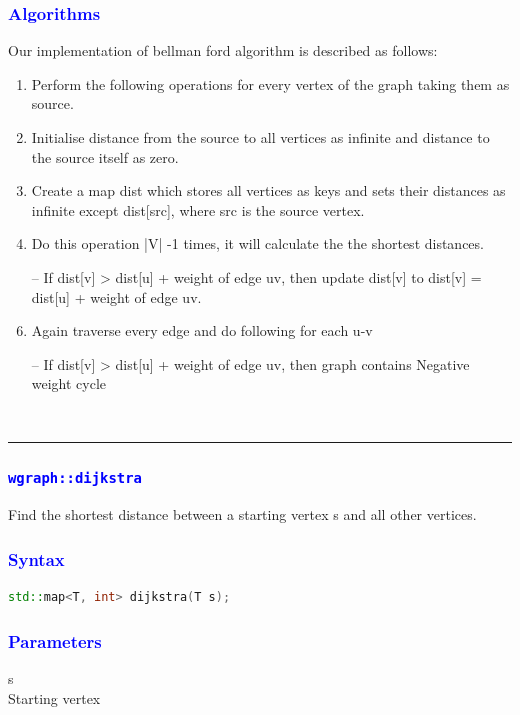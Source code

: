 \documentclass[11pt,a4paper]{article}
\begin{document}
\subsubsection*{\textcolor{blue}{ \large {Algorithms}}}
Our implementation of bellman ford algorithm is described as follows:
\begin{enumerate}  
\item Perform the following operations for every vertex of the graph taking them as source.

\item Initialise distance from the source to all vertices as infinite and distance to the source itself as zero.


\item Create a map dist which stores all vertices as keys and sets their distances as infinite except dist[src], where src is the source vertex.
\item Do this operation |V| -1 times, it will calculate the the shortest distances.
\item[--] If dist[v] > dist[u] + weight of edge uv, then update dist[v] to dist[v] = dist[u] + weight of edge uv.
\item Again traverse every edge and do following for each u-v 
\item[--]  If dist[v] > dist[u] + weight of edge uv, then graph contains Negative weight cycle


\end{enumerate}  

\\
\rule{17cm}{0.1mm}


\subsubsection*{\textcolor{blue}{\Large\texttt{wgraph::dijkstra}}}
Find the shortest distance between a starting vertex s and all other vertices.


\subsubsection*{\textcolor{blue}{ \large {Syntax}}}
\begin{lstlisting}[language=C++]
std::map<T, int> dijkstra(T s);
\end{lstlisting}

\subsubsection*{\textcolor{blue}{ \large {Parameters}}}
s\\
Starting vertex
\end{document}
